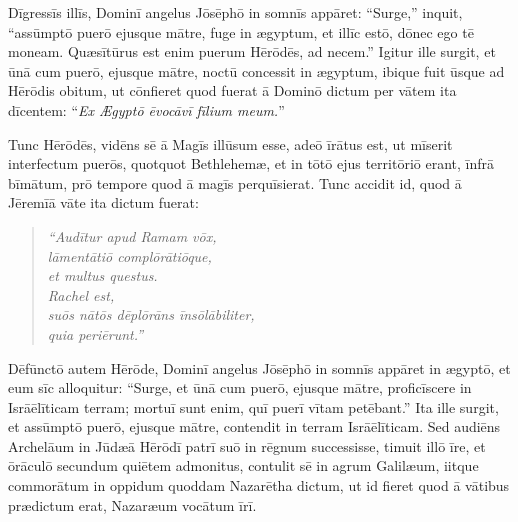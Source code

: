 \Versus Dīgressīs illīs, Dominī angelus Jōsēphō in somnīs appāret: ``Surge,'' inquit, ``assūm\-ptō puerō ejusque mātre, fuge in ægyptum, et illīc estō, dōnec ego tē moneam. Quæsītūrus est enim puerum Hērōdēs, ad necem.'' 
\Versus Igitur ille surgit, et ūnā cum puerō, ejusque mātre, noctū concessit in ægyptum, 
\Versus ibique fuit ūsque ad Hērōdis obitum, ut cōnfieret quod fuerat ā Dominō dictum per vātem ita dīcentem: ``\emph{Ex Ægyptō ēvocāvī fīlium meum.}''

\Versus Tunc Hērōdēs, vidēns sē ā Magīs illūsum esse, adeō īrātus est, ut mīserit interfectum puerōs, quotquot Bethlehemæ, et in tōtō ejus territōriō erant, īnfrā bīmātum, prō tempore quod ā magīs perquīsierat. 
\Versus Tunc accidit id, quod ā Jēremīā vāte ita dictum fuerat: 

\begin{verse}
\begin{patverse*}
\Versus \emph{``Audītur apud Ramam vōx,\\
lāmentātiō complōrātiōque,\\
et multus questus.\\
Rachel est,\\
suōs nātōs dēplōrāns īnsōlābiliter,\\
quia periērunt.''}
\end{patverse*}
\end{verse}

\Versus Dēfūnctō autem Hērōde, Dominī angelus Jōsēphō in somnīs appāret in ægyptō, 
\Versus et eum sīc alloquitur: ``Surge, et ūnā cum puerō, ejusque mātre, proficīscere in Isrāēlīticam terram; mortuī sunt enim, quī puerī vītam petēbant.'' 
\Versus Ita ille surgit, et assūmptō puerō, ejusque mātre, contendit in terram Isrāēlīticam. 
\Versus Sed audiēns Archelāum in Jūdæā Hērōdī patrī suō in rēgnum successisse, timuit illō īre, et ōrāculō secundum quiētem admonitus, contulit sē in agrum Galilæum, 
\Versus iitque commorātum in oppidum quoddam Nazarētha dictum, ut id fieret quod ā vātibus prædictum erat, Nazaræum vocātum īrī.
 


